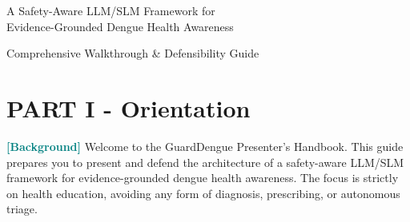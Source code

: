 \documentclass[11pt,a4paper]{article}
\newcommand{\origintag}[2]{\textcolor{#1}{\small\textbf{[#2]}}}
\begin{document}
\begin{titlepage}
    \begin{center}
        \vspace*{2cm}
        
        
        \vspace{1.5cm}
        {\Large \color{teal} A Safety-Aware LLM/SLM Framework for} \\
        {\Large \color{teal} Evidence-Grounded Dengue Health Awareness}
        
        \vspace{2cm}
        {\large \color{slate} Comprehensive Walkthrough \& Defensibility Guide}
        
        \vfill
        
        
        \vspace{2cm}
    \end{center}
\end{titlepage}

{\color{navy}\tableofcontents}
\newpage
\section{PART I - Orientation}

\origintag{teal}{Background} Welcome to the GuardDengue Presenter's Handbook. This guide prepares you to present and defend the architecture of a safety-aware LLM/SLM framework for evidence-grounded dengue health awareness. The focus is strictly on health education, avoiding any form of diagnosis, prescribing, or autonomous triage.
\end{document}

